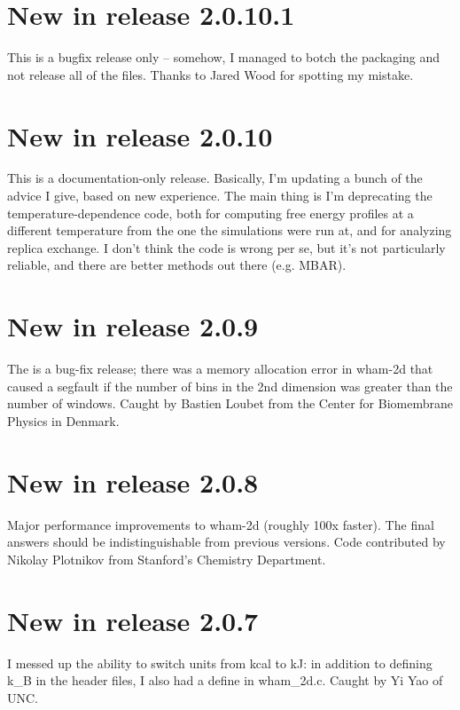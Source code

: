 \documentclass[12pt]{article}
\begin{document}
\section{New in release 2.0.10.1}

This is a bugfix release only -- somehow, I managed to botch the packaging
and not release all of the files. Thanks to Jared Wood for spotting my
mistake.

\section{New in release 2.0.10}

This is a documentation-only release. Basically, I'm updating a bunch of the advice I give, based on new experience. The main thing is I'm deprecating the temperature-dependence code, both for computing free energy profiles at a different temperature from the one the simulations were run at, and for analyzing replica exchange. I don't think the code is wrong per se, but it's not particularly reliable, and there are better methods out there (e.g. MBAR).

\section{New in release 2.0.9}

The is a bug-fix release; there was a memory allocation error in wham-2d
that caused a segfault if the number of bins in the 2nd dimension was
greater than the number of windows.  Caught by Bastien Loubet from the
Center for Biomembrane Physics in Denmark.

\section{New in release 2.0.8}

Major performance improvements to wham-2d (roughly 100x faster).  The final
answers should be indistinguishable from previous versions.  Code
contributed by Nikolay Plotnikov from Stanford's Chemistry Department.

\section{New in release 2.0.7}

I messed up the ability to switch units from kcal to kJ: in addition to
defining k\_B in the header files, I also had a define in wham\_2d.c.  Caught
by Yi Yao of UNC.
\end{document}
